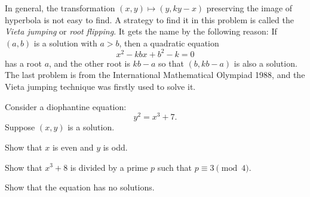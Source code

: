 \documentclass{../prb}
\begin{document}
\begin{note}
In general, the transformation $(x,y)\mapsto(y,ky-x)$ preserving the image of hyperbola is not easy to find.
A strategy to find it in this problem is called the \emph{Vieta jumping} or \emph{root flipping}.
It gets the name by the following reason:
If $(a,b)$ is a solution with $a>b$, then a quadratic equation \[x^2-kbx+b^2-k=0\] has a root $a$, and the other root is $kb-a$ so that $(b,kb-a)$ is also a solution.
The last problem is from the International Mathematical Olympiad 1988, and the Vieta jumping technique was firstly used to solve it.
\end{note}

\begin{prb}
Consider a diophantine equation:
\[y^2=x^3+7.\]
Suppose $(x,y)$ is a solution.
\begin{cond}
\item Show that $x$ is even and $y$ is odd.
\item Show that $x^3+8$ is divided by a prime $p$ such that $p\equiv3\pmod{4}$.
\item Show that the equation has no solutions.
\end{cond}
\end{prb}
\end{document}
